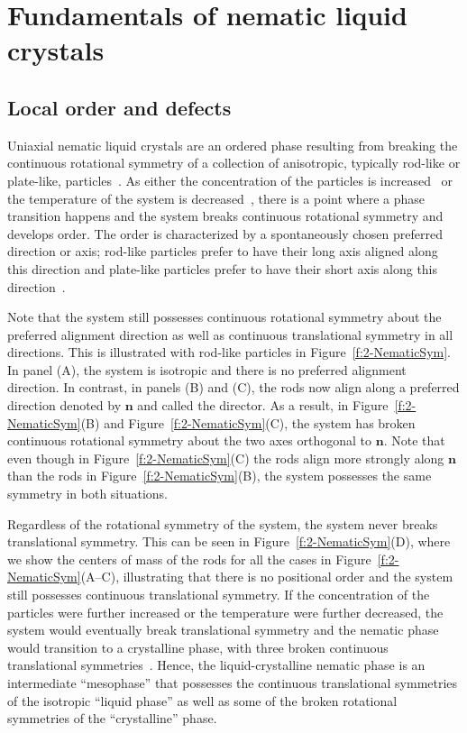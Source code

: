 \chapter{Fundamentals of nematic liquid crystals}\label{c:2}

\section{Local order and defects}
Uniaxial nematic liquid crystals are an ordered phase resulting from breaking the continuous rotational symmetry of a collection of anisotropic, typically rod-like or plate-like, particles~\cite{RN33}.
As either the concentration of the particles is increased~\cite{RN204} or the temperature of the system is decreased~\cite{RN202}, there is a point where a phase transition happens and the system breaks continuous rotational symmetry and develops order.
The order is characterized by a spontaneously chosen preferred direction or axis; rod-like particles prefer to have their long axis aligned along this direction and plate-like particles prefer to have their short axis along this direction~\cite{RN33,RN175}.

Note that the system still possesses continuous rotational symmetry about the preferred alignment direction as well as continuous translational symmetry in  all directions.
This is illustrated with rod-like particles in Figure~\ref{f:2-NematicSym}.
In panel (A), the system is isotropic and there is no preferred alignment direction.
In contrast, in panels (B) and (C), the rods now align along a preferred direction denoted by $\mathbf{n}$ and called the director.
As a result, in Figure~\ref{f:2-NematicSym}(B) and Figure~\ref{f:2-NematicSym}(C), the system has broken continuous rotational symmetry about the two axes orthogonal to $\mathbf{n}$.
Note that even though in Figure~\ref{f:2-NematicSym}(C) the rods align more strongly along $\mathbf{n}$ than the rods in Figure~\ref{f:2-NematicSym}(B), the system possesses the same symmetry in both situations.

Regardless of the rotational symmetry of the system, the system never breaks translational symmetry.
This can be seen in Figure~\ref{f:2-NematicSym}(D), where we show the centers of mass of the rods for all the cases in Figure~\ref{f:2-NematicSym}(A--C), illustrating that there is no positional order and the system still possesses continuous translational symmetry.
If the concentration of the particles were further increased or the temperature were further decreased, the system would eventually break translational symmetry and the nematic phase would transition to a crystalline phase, with three broken continuous translational symmetries~\cite{RN33}.
Hence, the liquid-crystalline nematic phase is an intermediate ``mesophase'' that possesses the continuous translational symmetries of the isotropic ``liquid phase'' as well as some of the broken rotational symmetries of the ``crystalline'' phase.

